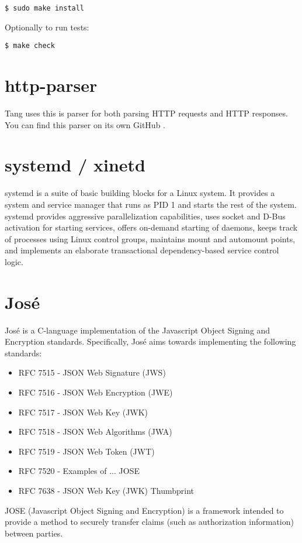 \documentclass[../xdudla00-porting-Tang-to-Open-WRT.tex]{subfiles}
\begin{document}
{\tt \$ sudo make install}

Optionally to run tests:

{\tt \$ make check}

\section{http-parser}\label{parser}
Tang uses this is parser for both parsing HTTP requests and HTTP responses.
You can find this parser on its own GitHub \cite{http-parser}.

\section{systemd / xinetd}\label{systemd}
systemd \cite{systemd} is a suite of basic building blocks for a Linux system. It provides a system and service manager that runs as PID 1 and starts the rest of the system. systemd provides aggressive parallelization capabilities, uses socket and D-Bus activation for starting services, offers on-demand starting of daemons, keeps track of processes using Linux control groups, maintains mount and automount points, and implements an elaborate transactional dependency-based service control logic.

\section{José}\label{jose}
José \cite{Jos} is a C-language implementation of the Javascript Object Signing and Encryption standards. Specifically, José aims towards implementing the following standards:
\begin{itemize}
   \item RFC 7515 - JSON Web Signature (JWS)        \cite{JWS}
   \item RFC 7516 - JSON Web Encryption (JWE)       \cite{JWE}
   \item RFC 7517 - JSON Web Key (JWK)              \cite{JWK}
   \item RFC 7518 - JSON Web Algorithms (JWA)       \cite{JWA}
   \item RFC 7519 - JSON Web Token (JWT)            \cite{JWT}
   \item RFC 7520 - Examples of ... JOSE
   \item RFC 7638 - JSON Web Key (JWK) Thumbprint   \cite{JWK}
\end{itemize}

JOSE (Javascript Object Signing and Encryption) is a framework intended to provide a method to securely transfer claims (such as authorization information) between parties.
\end{document}

